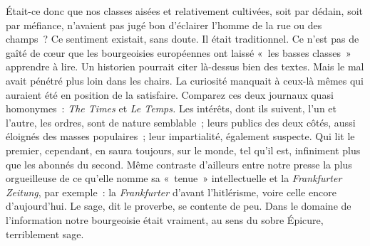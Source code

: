 \documentclass[french,twoside]{book} %
\begin{document}
Était-ce donc que nos classes aisées et relativement cultivées, soit par dédain, soit par méfiance, n’avaient pas jugé bon d’éclairer l’homme de la rue ou des champs ? Ce sentiment existait, sans doute. Il était traditionnel. Ce n’est pas de gaîté de cœur que les bourgeoisies européennes ont laissé « les basses classes » apprendre à lire. Un historien pourrait citer là-dessus bien des textes. Mais le mal avait pénétré plus loin dans les chairs. La curiosité manquait à ceux-là mêmes qui auraient été en position de la satisfaire. Comparez ces deux journaux quasi homonymes : {\itshape The Times} et {\itshape Le Temps.} Les intérêts, dont ils suivent, l’un et l’autre, les ordres, sont de nature semblable ; leurs publics des deux côtés, aussi éloignés des masses populaires ; leur impartialité, également suspecte. Qui lit le premier, cependant, en saura toujours, sur le monde, tel qu’il est, infiniment plus que les abonnés du second. Même contraste d’ailleurs entre notre presse la plus orgueilleuse de ce qu’elle nomme sa « tenue » intellectuelle et la {\itshape Frankfurter Zeitung}, par exemple : la   {\itshape Frankfurter} d’avant l’hitlérisme, voire celle encore d’aujourd’hui. Le sage, dit le proverbe, se contente de peu. Dans le domaine de l’information notre bourgeoisie était vraiment, au sens du sobre Épicure, terriblement sage.\par
\end{document}
